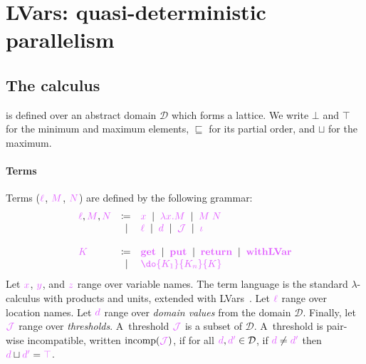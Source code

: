 \documentclass[main.tex]{subfiles}
\begin{document}
\section{LVars: quasi-deterministic parallelism}

\subsection{The \lambdalvar calculus}

\lambdalvar is defined over an abstract domain $\mathcal{D}$ which forms a lattice. We write $\bot$ and $\top$ for the minimum and maximum elements, $\sqsubseteq$ for its partial order, and $\sqcup$ for the maximum.

\paragraph*{Terms}
Terms ($\tm{\ell}$, $\tm{M}$, $\tm{N}$) are defined by the following grammar:
\[
  \begin{array}{lrll}
  \tm{\ell}, \tm{M}, \tm{N}
  & \coloneqq & \tm{x}
     \sep        \tm{\lambda x.M}
     \sep        \tm{M\;N}   \\
  & \sep      & \tm{\ell}
      \sep        \tm{d}
       \sep        \tmJ
       \sep       \tm{\iota}
  \\
  \\
   \tm{K}
  & \coloneqq & \tm{\lvarget}
    \sep        \tm{\lvarput}
    \sep        \tm{\return}
    \sep        \tm{\lvarrun} \\
    & \sep &        \tm{\do{K_1}{K_n}{K}}
\end{array}
\]
Let $\tm{x}$, $\tm{y}$, and $\tm{z}$ range over variable names. The term language is the standard $\lambda$-calculus with products and units, extended with LVars~\citep{kuper15}. Let $\tm{\ell}$ range over location names. Let $\tm{d}$ range over \emph{domain values} from the domain $\mathcal{D}$. Finally, let $\tmJ$ range over \emph{thresholds}. A~threshold $\tmJ$ is a subset of $\mathcal{D}$. A~threshold is pair-wise incompatible, written $\incomp(\tmJ)$, if for all $\tm{d},\tm{d'}\in\mathcal{D}$, if $\tm{d}\neq\tm{d'}$ then $\tm{d}\sqcup\tm{d'}=\tm{\top}$.
\end{document}
